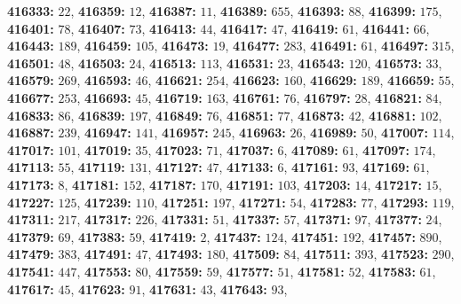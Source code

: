 \textsf{\bfseries 416333:} $22$, \textsf{\bfseries 416359:} $12$, \textsf{\bfseries 416387:} $11$, \textsf{\bfseries 416389:} $655$, \textsf{\bfseries 416393:} $88$, \textsf{\bfseries 416399:} $175$, \textsf{\bfseries 416401:} $78$, \textsf{\bfseries 416407:} $73$, \textsf{\bfseries 416413:} $44$, \textsf{\bfseries 416417:} $47$, \textsf{\bfseries 416419:} $61$, \textsf{\bfseries 416441:} $66$, \textsf{\bfseries 416443:} $189$, \textsf{\bfseries 416459:} $105$, \textsf{\bfseries 416473:} $19$, \textsf{\bfseries 416477:} $283$, \textsf{\bfseries 416491:} $61$, \textsf{\bfseries 416497:} $315$, \textsf{\bfseries 416501:} $48$, \textsf{\bfseries 416503:} $24$, \textsf{\bfseries 416513:} $113$, \textsf{\bfseries 416531:} $23$, \textsf{\bfseries 416543:} $120$, \textsf{\bfseries 416573:} $33$, \textsf{\bfseries 416579:} $269$, \textsf{\bfseries 416593:} $46$, \textsf{\bfseries 416621:} $254$, \textsf{\bfseries 416623:} $160$, \textsf{\bfseries 416629:} $189$, \textsf{\bfseries 416659:} $55$, \textsf{\bfseries 416677:} $253$, \textsf{\bfseries 416693:} $45$, \textsf{\bfseries 416719:} $163$, \textsf{\bfseries 416761:} $76$, \textsf{\bfseries 416797:} $28$, \textsf{\bfseries 416821:} $84$, \textsf{\bfseries 416833:} $86$, \textsf{\bfseries 416839:} $197$, \textsf{\bfseries 416849:} $76$, \textsf{\bfseries 416851:} $77$, \textsf{\bfseries 416873:} $42$, \textsf{\bfseries 416881:} $102$, \textsf{\bfseries 416887:} $239$, \textsf{\bfseries 416947:} $141$, \textsf{\bfseries 416957:} $245$, \textsf{\bfseries 416963:} $26$, \textsf{\bfseries 416989:} $50$, \textsf{\bfseries 417007:} $114$, \textsf{\bfseries 417017:} $101$, \textsf{\bfseries 417019:} $35$, \textsf{\bfseries 417023:} $71$, \textsf{\bfseries 417037:} $6$, \textsf{\bfseries 417089:} $61$, \textsf{\bfseries 417097:} $174$, \textsf{\bfseries 417113:} $55$, \textsf{\bfseries 417119:} $131$, \textsf{\bfseries 417127:} $47$, \textsf{\bfseries 417133:} $6$, \textsf{\bfseries 417161:} $93$, \textsf{\bfseries 417169:} $61$, \textsf{\bfseries 417173:} $8$, \textsf{\bfseries 417181:} $152$, \textsf{\bfseries 417187:} $170$, \textsf{\bfseries 417191:} $103$, \textsf{\bfseries 417203:} $14$, \textsf{\bfseries 417217:} $15$, \textsf{\bfseries 417227:} $125$, \textsf{\bfseries 417239:} $110$, \textsf{\bfseries 417251:} $197$, \textsf{\bfseries 417271:} $54$, \textsf{\bfseries 417283:} $77$, \textsf{\bfseries 417293:} $119$, \textsf{\bfseries 417311:} $217$, \textsf{\bfseries 417317:} $226$, \textsf{\bfseries 417331:} $51$, \textsf{\bfseries 417337:} $57$, \textsf{\bfseries 417371:} $97$, \textsf{\bfseries 417377:} $24$, \textsf{\bfseries 417379:} $69$, \textsf{\bfseries 417383:} $59$, \textsf{\bfseries 417419:} $2$, \textsf{\bfseries 417437:} $124$, \textsf{\bfseries 417451:} $192$, \textsf{\bfseries 417457:} $890$, \textsf{\bfseries 417479:} $383$, \textsf{\bfseries 417491:} $47$, \textsf{\bfseries 417493:} $180$, \textsf{\bfseries 417509:} $84$, \textsf{\bfseries 417511:} $393$, \textsf{\bfseries 417523:} $290$, \textsf{\bfseries 417541:} $447$, \textsf{\bfseries 417553:} $80$, \textsf{\bfseries 417559:} $59$, \textsf{\bfseries 417577:} $51$, \textsf{\bfseries 417581:} $52$, \textsf{\bfseries 417583:} $61$, \textsf{\bfseries 417617:} $45$, \textsf{\bfseries 417623:} $91$, \textsf{\bfseries 417631:} $43$, \textsf{\bfseries 417643:} $93$, 
